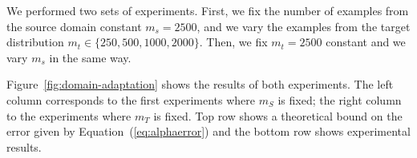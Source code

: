 \documentclass[letterpaper]{article}
\begin{document}
We performed two sets of experiments. First, we fix the number of
examples from the source domain constant $m_s=2500$, and we vary the
examples from the target distribution $m_t \in \{250, 500, 1000,
2000\}$. Then, we fix $m_t=2500$ constant and we vary $m_s$ in the
same way. 

Figure~\ref{fig:domain-adaptation} shows the results of both
experiments. The left column corresponds to the first experiments where
$m_S$ is fixed; the right column to the experiments where $m_T$ is
fixed. Top row shows a theoretical bound on the error given by
Equation~(\ref{eq:alphaerror}) and the bottom row shows experimental
results.

\begin{figure}[ht]
  \centering

\end{figure}
\end{document}
